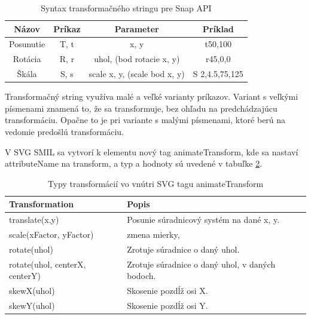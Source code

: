 \begin{table}[H]
	\begin{center}
		\begin{tabular}{|c|c|c|c|}
			\hline \textbf{Názov} & \textbf{Príkaz} & \textbf{Parameter} & \textbf{Príklad} \\ 
			\hline Posunutie & T, t & x, y & t50,100 \\ 
			\hline Rotácia& R, r & uhol, (bod rotacie x, y) & r45,0,0 \\ 
			\hline Škála & S, s & scale x, y, (scale bod x, y) & S 2,4.5,75,125 \\ 
			\hline 
		\end{tabular} 	
	\end{center}
	\label{tab:trasf}
	\caption{Syntax transformačného stringu pre Snap API}
\end{table}

Transformačný string využíva malé a veľké varianty príkazov. Variant s veľkými písmenami znamená to, že sa transformuje, bez ohľadu na predchádzajúcu transformáciu. Opačne to je pri variante s malými písmenami, ktoré berú na vedomie predošlú transformáciu.\cite[p.~52]{Dawber} 

V SVG SMIL sa vytvorí k elementu nový tag animateTransform, kde sa nastaví attributeName na transform, a typ a hodnoty sú uvedené v tabuľke \ref{tab:svgTrans}. 

\begin{table}[H]
	\begin{center}
		\begin{tabular}{|l|p{9cm}|}
			\hline \textbf{Transformation} & \textbf{Popis} \\ 
			\hline translate(x,y) & Posunie súradnicový systém na dané x, y.  \\ 
			\hline scale(xFactor, yFactor) & zmena mierky, \\ 
			\hline rotate(uhol) & Zrotuje súradnice o daný uhol.  \\ 
			\hline rotate(uhol, centerX, centerY) & Zrotuje súradnice o daný uhol, v daných bodoch.  \\ 
			\hline skewX(uhol) &  Skosenie pozdĺž osi X.  \\ 
			\hline skewY(uhol) &  Skosenie pozdĺž osi Y.  \\ 
			\hline 
		\end{tabular} 
		
	\end{center}
	\label{tab:svgTrans}
	\caption{Typy transformácií vo vnútri SVG tagu animateTransform }
\end{table}

